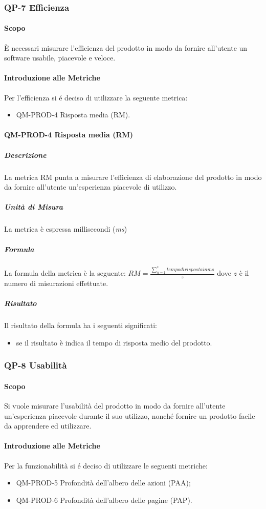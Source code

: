 	\subsubsection{QP-7 Efficienza}
		\paragraph{Scopo}
			È necessari misurare l'efficienza del prodotto in modo da fornire all'utente un software usabile, piacevole e veloce.
		\paragraph{Introduzione alle Metriche}
			Per l'efficienza si é deciso di utilizzare la seguente metrica:
			\begin{itemize}
				\item QM-PROD-4 Risposta media (RM).
			\end{itemize}
		\paragraph{QM-PROD-4 Risposta media (RM)}
			\subparagraph{Descrizione}
				La metrica RM punta a misurare l'efficienza di elaborazione del prodotto in modo da fornire all'utente un'esperienza piacevole di utilizzo.
			\subparagraph{Unità di Misura}
				La metrica è espressa millisecondi (\textit{ms})
			\subparagraph{Formula}
				La formula della metrica è la seguente:
				\(
					RM = \frac{\sum_{n=1}^{z} tempo di risposta in ms}{z}
				\)
				dove $z$ è il numero di misurazioni effettuate.
			\subparagraph{Risultato}
				Il risultato della formula ha i seguenti significati:
				\begin{itemize}
					\item se il risultato è indica il tempo di risposta medio del prodotto.
				\end{itemize}

	\subsubsection{QP-8 Usabilità}
		\paragraph{Scopo}
		Si vuole misurare l'usabilità del prodotto in modo da fornire all'utente un'esperienza piacevole durante il suo utilizzo, nonché fornire un prodotto facile da apprendere ed utilizzare.
		\paragraph{Introduzione alle Metriche}
			Per la funzionabilità si é deciso di utilizzare le seguenti metriche:
			\begin{itemize}
				\item QM-PROD-5 Profondità dell'albero delle azioni (PAA);
				\item QM-PROD-6 Profondità dell'albero delle pagine (PAP).
			\end{itemize}
